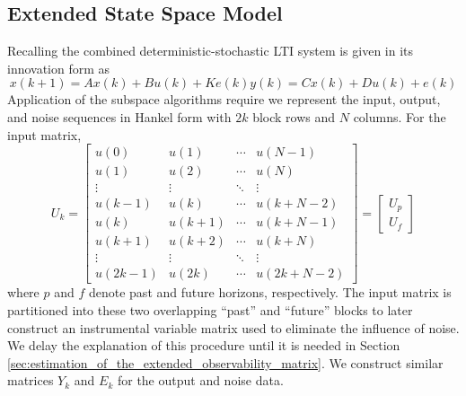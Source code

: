 \subsection{Extended State Space Model}\label{sec:extended_state_space_model}
Recalling the combined deterministic-stochastic LTI system is given in its innovation form as
\begin{subequations}\label{eq:3_innovation}
\begin{equation}x(k+1) = Ax(k) + Bu(k) + Ke(k)\end{equation}
\begin{equation}y(k) = Cx(k) + Du(k) + e(k)\end{equation}
\end{subequations}
Application of the subspace algorithms require we represent the input, output, and noise sequences in Hankel form with $2k$ block rows and $N$ columns. For the input matrix,
\begin{equation}\label{eq:3_input}
U_k = \begin{bmatrix}
u(0) & u(1) & \cdots & u(N-1)\\
u(1) & u(2) & \cdots & u(N)\\
\vdots & \vdots & \ddots & \vdots\\
u(k-1) & u(k) & \cdots & u(k+N-2)\\
\hline
u(k) & u(k+1) & \cdots & u(k+N-1)\\
u(k+1) & u(k+2) & \cdots & u(k+N)\\
\vdots & \vdots & \ddots & \vdots\\
u(2k-1) & u(2k) & \cdots & u(2k+N-2)
\end{bmatrix} = 
\begin{bmatrix} U_p\\ \hline U_f\end{bmatrix}
\end{equation}
where $p$ and $f$ denote past and future horizons, respectively. The input matrix is partitioned into these two overlapping ``past'' and ``future'' blocks to later construct an instrumental variable matrix used to eliminate the influence of noise. We delay the explanation of this procedure until it is needed in Section \ref{sec:estimation_of_the_extended_observability_matrix}. We construct similar matrices $Y_k$ and $E_k$ for the output and noise data.

